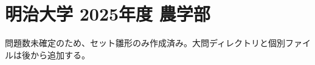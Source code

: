 \documentclass[../../uem_mat_mei_q.tex]{subfiles}
\begin{document}
    \section{明治大学 2025年度 農学部}

    問題数未確定のため、セット雛形のみ作成済み。大問ディレクトリと個別ファイルは後から追加する。
\end{document}
